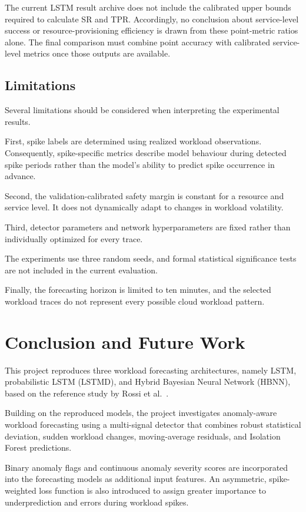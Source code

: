 \documentclass[conference]{IEEEtran}
\begin{document}
The current LSTM result archive does not include the calibrated upper bounds required to calculate SR and TPR. Accordingly, no conclusion about service-level success or resource-provisioning efficiency is drawn from these point-metric ratios alone. The final comparison must combine point accuracy with calibrated service-level metrics once those outputs are available.

\subsection{Limitations}

Several limitations should be considered when interpreting the experimental results.

First, spike labels are determined using realized workload observations. Consequently, spike-specific metrics describe model behaviour during detected spike periods rather than the model's ability to predict spike occurrence in advance.

Second, the validation-calibrated safety margin is constant for a resource and service level. It does not dynamically adapt to changes in workload volatility.

Third, detector parameters and network hyperparameters are fixed rather than individually optimized for every trace.

The experiments use three random seeds, and formal statistical significance tests are not included in the current evaluation.

Finally, the forecasting horizon is limited to ten minutes, and the selected workload traces do not represent every possible cloud workload pattern.

\section{Conclusion and Future Work}

This project reproduces three workload forecasting architectures, namely LSTM, probabilistic LSTM (LSTMD), and Hybrid Bayesian Neural Network (HBNN), based on the reference study by Rossi et al.~\cite{rossi2025}.

Building on the reproduced models, the project investigates anomaly-aware workload forecasting using a multi-signal detector that combines robust statistical deviation, sudden workload changes, moving-average residuals, and Isolation Forest predictions.

Binary anomaly flags and continuous anomaly severity scores are incorporated into the forecasting models as additional input features. An asymmetric, spike-weighted loss function is also introduced to assign greater importance to underprediction and errors during workload spikes.
\end{document}
